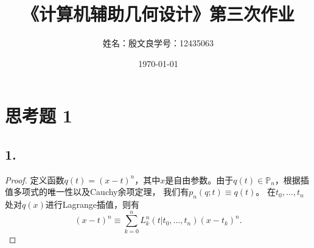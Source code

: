 \documentclass[utf8]{ctexart}
\title{《计算机辅助几何设计》第三次作业}
\author{姓名：殷文良\qquad 学号：12435063}
\date{\today}
\begin{document}
\maketitle
{}

\section*{思考题 1}
\subsection*{1.}
\begin{proof}
    定义函数$q(t)=(x-t)^n$，其中$x$是自由参数。由于$q(t)\in \mathbb{P}_n$，根据插值多项式的唯一性以及Cauchy余项定理，
    我们有$p_n(q;t) \equiv q(t)$。
    在$t_0,\dots,t_n$处对$q(x)$进行Lagrange插值，则有
    $$
    (x-t)^n \equiv \sum_{k=0}^nL_k^n(t|t_0,\dots,t_n)(x-t_k)^n.
    $$
\end{proof}
\end{document}
